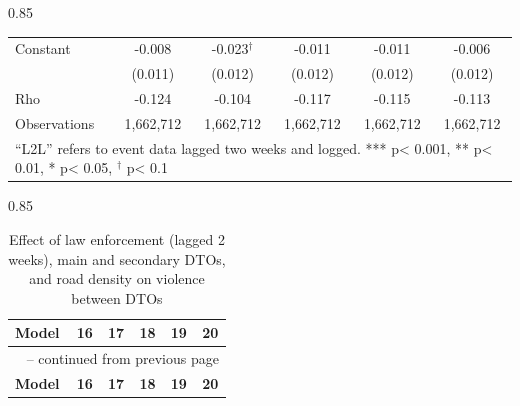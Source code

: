 \documentclass[12pt,letterpaper]{article}
\begin{document}
\begin{landscape}
\begin{center}
\begin{spacing}{0.85}
\begin{longtable}{lccccc}
Constant & -0.008  & -0.023$^{\dag}$& -0.011  & -0.011  & -0.006  \\
 & (0.011)  & (0.012)  & (0.012)  & (0.012)  & (0.012)  \\ \hline
                
Rho & -0.124  & -0.104  & -0.117  & -0.115  & -0.113  \\
                
Observations  & 1,662,712  & 1,662,712  & 1,662,712  & 1,662,712  & 1,662,712  \\

\hline  
\multicolumn{6}{l}{``L2L'' refers to event data lagged two weeks and logged.  *** p< 0.001, ** p< 0.01, * p< 0.05, $^{\dag}$ p< 0.1} \\
 
\end{longtable}
\end{spacing}
\end{center}






\begin{center}
\small
\begin{spacing}{0.85}
\begin{longtable}{lccccc}

\caption{Effect of law enforcement (lagged 2 weeks), main and secondary DTOs, and road density on violence between DTOs} \label{tab:enforcement_MainMinorDTOs_Road_L2L} \\

\hline 
\multicolumn{1}{l}{\textbf{Model }} &\multicolumn{1}{c}{\textbf{16}} & \multicolumn{1}{c}{\textbf{17}} & \multicolumn{1}{c}{\textbf{18}} & \multicolumn{1}{c}{\textbf{19}} & \multicolumn{1}{c}{\textbf{20}} \\ \hline 
\endfirsthead


\multicolumn{6}{c}{{\tablename\ \thetable{} -- continued from previous page}} \\ \hline
\multicolumn{1}{l}{\textbf{Model }} &\multicolumn{1}{c}{\textbf{16}} & \multicolumn{1}{c}{\textbf{17}} & \multicolumn{1}{c}{\textbf{18}} & \multicolumn{1}{c}{\textbf{19}} & \multicolumn{1}{c}{\textbf{20}} \\ \hline 
\endhead


\end{longtable}
\end{spacing}
\end{center}
\end{landscape}
\end{document}
